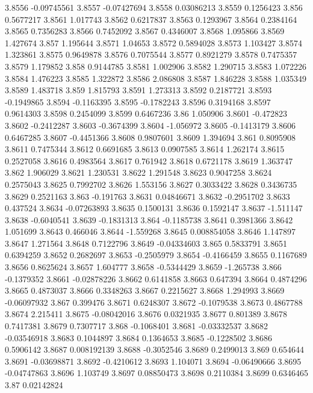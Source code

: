 3.8556  -0.09745561
3.8557  -0.07427694
3.8558  0.03086213
3.8559  0.1256423
3.856  0.5677217
3.8561  1.017743
3.8562  0.6217837
3.8563  0.1293967
3.8564  0.2384164
3.8565  0.7356283
3.8566  0.7452092
3.8567  0.4346007
3.8568  1.095866
3.8569  1.427674
3.857  1.195644
3.8571  1.04653
3.8572  0.5894028
3.8573  1.103427
3.8574  1.323861
3.8575  0.9649878
3.8576  0.7075544
3.8577  0.8921279
3.8578  0.7475357
3.8579  1.179852
3.858  0.9144785
3.8581  1.002906
3.8582  1.290715
3.8583  1.072226
3.8584  1.476223
3.8585  1.322872
3.8586  2.086808
3.8587  1.846228
3.8588  1.035349
3.8589  1.483718
3.859  1.815793
3.8591  1.273313
3.8592  0.2187721
3.8593  -0.1949865
3.8594  -0.1163395
3.8595  -0.1782243
3.8596  0.3194168
3.8597  0.9614303
3.8598  0.2454099
3.8599  0.6467236
3.86  1.050906
3.8601  -0.472823
3.8602  -0.2412287
3.8603  -0.3674399
3.8604  -1.056972
3.8605  -0.1413179
3.8606  0.6467285
3.8607  -0.4451366
3.8608  0.9807601
3.8609  1.394694
3.861  0.8095908
3.8611  0.7475344
3.8612  0.6691685
3.8613  0.0907585
3.8614  1.262174
3.8615  0.2527058
3.8616  0.4983564
3.8617  0.761942
3.8618  0.6721178
3.8619  1.363747
3.862  1.906029
3.8621  1.230531
3.8622  1.291548
3.8623  0.9047258
3.8624  0.2575043
3.8625  0.7992702
3.8626  1.553156
3.8627  0.3033422
3.8628  0.3436735
3.8629  0.2521163
3.863  -0.191763
3.8631  0.04846671
3.8632  -0.2951702
3.8633  0.437524
3.8634  -0.07263893
3.8635  0.1500131
3.8636  0.1592147
3.8637  -1.511147
3.8638  -0.6040541
3.8639  -0.1831313
3.864  -0.1185738
3.8641  0.3981366
3.8642  1.051699
3.8643  0.466046
3.8644  -1.559268
3.8645  0.008854058
3.8646  1.147897
3.8647  1.271564
3.8648  0.7122796
3.8649  -0.04334603
3.865  0.5833791
3.8651  0.6394259
3.8652  0.2682697
3.8653  -0.2505979
3.8654  -0.4166459
3.8655  0.1167689
3.8656  0.8625624
3.8657  1.604777
3.8658  -0.5344429
3.8659  -1.265738
3.866  -0.1379352
3.8661  -0.02878226
3.8662  0.6141858
3.8663  0.647394
3.8664  0.4874296
3.8665  0.4873037
3.8666  0.3348263
3.8667  0.2215627
3.8668  1.294993
3.8669  -0.06097932
3.867  0.399476
3.8671  0.6248307
3.8672  -0.1079538
3.8673  0.4867788
3.8674  2.215411
3.8675  -0.08042016
3.8676  0.0321935
3.8677  0.801389
3.8678  0.7417381
3.8679  0.7307717
3.868  -0.1068401
3.8681  -0.03332537
3.8682  -0.03546918
3.8683  0.1044897
3.8684  0.1364653
3.8685  -0.1228502
3.8686  0.5906142
3.8687  0.008192139
3.8688  -0.3052546
3.8689  0.2499013
3.869  0.654644
3.8691  -0.03698871
3.8692  -0.4210612
3.8693  1.104071
3.8694  -0.06490666
3.8695  -0.04747863
3.8696  1.103749
3.8697  0.08850473
3.8698  0.2110384
3.8699  0.6346465
3.87  0.02142824
